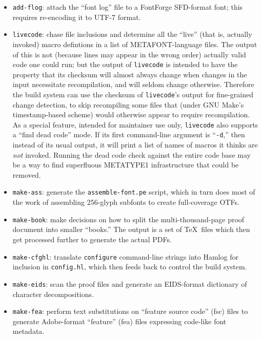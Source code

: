 \documentclass[14pt]{extarticle}
\begin{document}
\begin{itemize}

\item \texttt{add-flog}: attach the ``font log'' file to a FontForge
SFD-format font; this requires re-encoding it to UTF-7 format.

\item \texttt{livecode}: chase file inclusions and determine all the
``live'' (that is, actually invoked) macro defintions in a list of
METAFONT-language files.  The output of this is not (because lines may
appear in the wrong order) actually valid code one could run; but the output
of \texttt{livecode} is intended to have the property that its checksum will
almost always change when changes in the input necessitate recompilation,
and will seldom change otherwise.  Therefore the build system can use the
checksum of \texttt{livecode}'s output for fine-grained change detection, to
skip recompiling some files that (under GNU Make's timestamp-based scheme)
would otherwise appear to require recompilation.  As a special feature,
intended for maintainer use only, \texttt{livecode} also supports a ``find
dead code'' mode.  If its first command-line argument is ``\texttt{-d},''
then instead of its usual output, it will print a list of names of macros it
thinks are \emph{not} invoked.  Running the dead code check against the
entire code base may be a way to find superfluous METATYPE1 infrastructure
that could be removed.

\item \texttt{make-ass}: generate the \texttt{assemble-font.pe} script,
which in turn does most of the work of assembling 256-glyph subfonts to
create full-coverage OTFs.

\item \texttt{make-book}: make decisions on how to split the
multi-thousand-page proof document into smaller ``books.''  The output
is a set of \TeX\ files which then get processed further to generate the
actual PDFs.

\item \texttt{make-cfghl}: translate \texttt{configure} command-line strings
into Hamlog for inclusion in \texttt{config.hl}, which then feeds back to
control the build system.

\item \texttt{make-eids}: scan the proof files
and generate an EIDS-format dictionary of character decompositions.

\item \texttt{make-fea}: perform text substitutions on ``feature source
code'' (fsc) files to generate Adobe-format ``feature'' (fea) files
expressing code-like font metadata.


\end{itemize}
\end{document}
